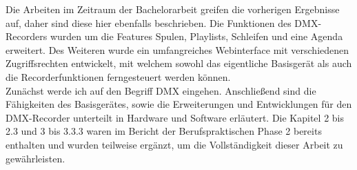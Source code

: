 \documentclass[11pt]{scrartcl}
\begin{document}
Die Arbeiten im Zeitraum der Bachelorarbeit greifen die vorherigen Ergebnisse auf, daher sind diese
hier ebenfalls beschrieben. Die Funktionen des DMX-Recorders wurden um die Features Spulen,
Playlists, Schleifen und eine Agenda erweitert. Des Weiteren wurde ein umfangreiches Webinterface
mit verschiedenen Zugriffsrechten entwickelt, mit welchem sowohl das eigentliche Basisgerät als
auch die Recorderfunktionen ferngesteuert werden können.\\
Zunächst werde ich auf den Begriff DMX eingehen. Anschließend sind die Fähigkeiten des
Basisgerätes, sowie die Erweiterungen und Entwicklungen für den DMX-Recorder unterteilt in
Hardware und Software erläutert. Die Kapitel 2 bis 2.3 und 3 bis 3.3.3 waren im Bericht der
Berufspraktischen Phase 2 bereits enthalten und wurden teilweise ergänzt, um die Vollständigkeit
dieser Arbeit zu gewährleisten.\\
\end{document}
